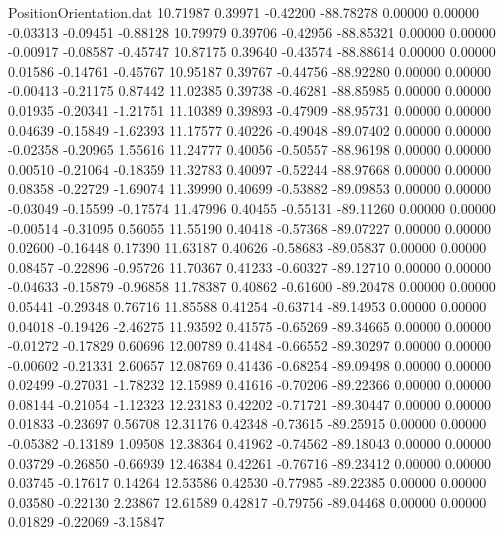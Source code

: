 \begin{filecontents}{PositionOrientation.dat}
  10.71987    0.39971   -0.42200   -88.78278    0.00000    0.00000   -0.03313   -0.09451   -0.88128
  10.79979    0.39706   -0.42956   -88.85321    0.00000    0.00000   -0.00917   -0.08587   -0.45747
  10.87175    0.39640   -0.43574   -88.88614    0.00000    0.00000    0.01586   -0.14761   -0.45767
  10.95187    0.39767   -0.44756   -88.92280    0.00000    0.00000   -0.00413   -0.21175    0.87442
  11.02385    0.39738   -0.46281   -88.85985    0.00000    0.00000    0.01935   -0.20341   -1.21751
  11.10389    0.39893   -0.47909   -88.95731    0.00000    0.00000    0.04639   -0.15849   -1.62393
  11.17577    0.40226   -0.49048   -89.07402    0.00000    0.00000   -0.02358   -0.20965    1.55616
  11.24777    0.40056   -0.50557   -88.96198    0.00000    0.00000    0.00510   -0.21064   -0.18359
  11.32783    0.40097   -0.52244   -88.97668    0.00000    0.00000    0.08358   -0.22729   -1.69074
  11.39990    0.40699   -0.53882   -89.09853    0.00000    0.00000   -0.03049   -0.15599   -0.17574
  11.47996    0.40455   -0.55131   -89.11260    0.00000    0.00000   -0.00514   -0.31095    0.56055
  11.55190    0.40418   -0.57368   -89.07227    0.00000    0.00000    0.02600   -0.16448    0.17390
  11.63187    0.40626   -0.58683   -89.05837    0.00000    0.00000    0.08457   -0.22896   -0.95726
  11.70367    0.41233   -0.60327   -89.12710    0.00000    0.00000   -0.04633   -0.15879   -0.96858
  11.78387    0.40862   -0.61600   -89.20478    0.00000    0.00000    0.05441   -0.29348    0.76716
  11.85588    0.41254   -0.63714   -89.14953    0.00000    0.00000    0.04018   -0.19426   -2.46275
  11.93592    0.41575   -0.65269   -89.34665    0.00000    0.00000   -0.01272   -0.17829    0.60696
  12.00789    0.41484   -0.66552   -89.30297    0.00000    0.00000   -0.00602   -0.21331    2.60657
  12.08769    0.41436   -0.68254   -89.09498    0.00000    0.00000    0.02499   -0.27031   -1.78232
  12.15989    0.41616   -0.70206   -89.22366    0.00000    0.00000    0.08144   -0.21054   -1.12323
  12.23183    0.42202   -0.71721   -89.30447    0.00000    0.00000    0.01833   -0.23697    0.56708
  12.31176    0.42348   -0.73615   -89.25915    0.00000    0.00000   -0.05382   -0.13189    1.09508
  12.38364    0.41962   -0.74562   -89.18043    0.00000    0.00000    0.03729   -0.26850   -0.66939
  12.46384    0.42261   -0.76716   -89.23412    0.00000    0.00000    0.03745   -0.17617    0.14264
  12.53586    0.42530   -0.77985   -89.22385    0.00000    0.00000    0.03580   -0.22130    2.23867
  12.61589    0.42817   -0.79756   -89.04468    0.00000    0.00000    0.01829   -0.22069   -3.15847

\end{filecontents}
